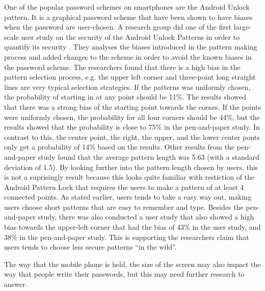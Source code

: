   One of the popular password schemes on smartphones are the Android Unlock pattern. It is a graphical password scheme that have been shown to have biases when the password are user-chosen. A research group did one of the first large-scale user study on the security of the Android Unlock Patterns in order to quantify its security \cite{Uellenbeck}. They analyses the biases introduced in the pattern making process and added changes to the scheme in order to avoid the known biases in the password scheme. The researchers found that there is a high bias in the pattern selection process, e.g. the upper left corner and three-point long straight lines are very typical selection strategies. If the patterns was uniformly chosen, the probability of starting in at any point should be 11\%. The results showed that there was a strong bias of the starting point towards the cornes. If the points were uniformly chosen, the probability for all four corners should be 44\%, but the results showed that the probability is close to 75\% in the pen-and-paper study. In contrast to this, the center point, the right, the upper, and the lower center ponts only get a probability of 14\% based on the results. Other results from the pen-and-paper study found that the average pattern length was 5.63 (with a standard deviation of 1.5). By looking further into the pattern length chosen by users, this is not a suprisingly result because this looks quite familiar with restiction of the Android Pattern Lock that requires the users to make a pattern of at least 4 connected points. As stated earlier, users tends to take a easy way out, making users choose short patterns that are easy to remember and type. Besides the pen-and-paper study, there was also conducted a user study that also showed a high bias towards the upper-left corner that had the bias of 43\% in the user study, and 38\% in the pen-and-paper study. This is supporting the researchers claim that users tends to choose less secure patterns ``in the wild''. 

  The way that the mobile phone is held, the size of the screen may also impact the way that people write their passwords, but this may need further research to answer.

  
